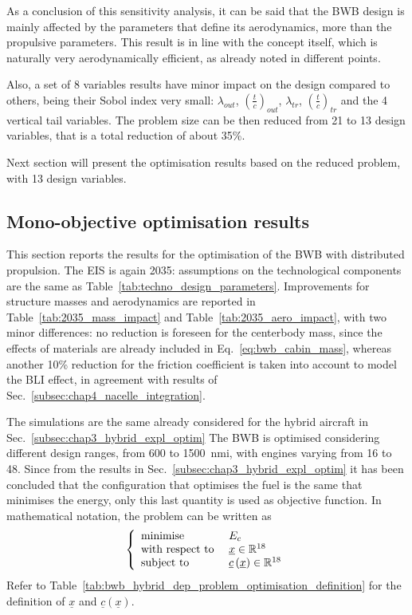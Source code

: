 As a conclusion of this sensitivity analysis, it can be said that the BWB design is mainly affected by the parameters that define its aerodynamics, more than the propulsive parameters. 
This result is in line with the concept itself, which is naturally very aerodynamically efficient, as already noted in different points. 

Also, a set of 8 variables results have minor impact on the design compared to others, being their Sobol index very small: $\lambda_{out}$, $\left(\frac{t}{c}\right)_{out}$, $\lambda_{tr}$, $\left(\frac{t}{c}\right)_{tr}$ and the 4 vertical tail variables. 
The problem size can be then reduced from 21 to 13 design variables, that is a total reduction of about 35\%.

Next section will present the optimisation results based on the reduced problem, with 13 design variables. 

\subsection{Mono-objective optimisation results}
\label{subsec:chap4_bwb_monoobj_res}

This section reports the results for the optimisation of the BWB with distributed propulsion. 
The EIS is again 2035: assumptions on the technological components are the same as Table~\ref{tab:techno_design_parameters}.
Improvements for structure masses and aerodynamics are reported in Table~\ref{tab:2035_mass_impact} and Table~\ref{tab:2035_aero_impact}, with two minor differences: no reduction is foreseen for the centerbody mass, since the effects of materials are already included in Eq.~\eqref{eq:bwb_cabin_mass}, whereas another 10\% reduction for the friction coefficient is taken into account to model the BLI effect, in agreement with results of Sec.~\ref{subsec:chap4_nacelle_integration}. 

The simulations are the same already considered for the hybrid aircraft in Sec.~\ref{subsec:chap3_hybrid_expl_optim}
The BWB is optimised considering different design ranges, from 600 to 1500~nmi, with engines varying from 16 to 48. 
Since from the results in Sec.~\ref{subsec:chap3_hybrid_expl_optim} it has been concluded that the configuration that optimises the fuel is the same that minimises the energy, only this last quantity is used as objective function. 
In mathematical notation, the problem can be written as
\begin{equation*}
\left\{\begin{array}{l l}
		\textrm{minimise } & E_c \\
		\textrm{with respect to } & \underline{x}\in\mathbb{R}^{18} \\
		\textrm{subject to } & \underline{c}\left(\underline{x}\right)\in\mathbb{R}^{18} \\						 
	\end{array}\right.
\end{equation*}
Refer to Table~\ref{tab:bwb_hybrid_dep_problem_optimisation_definition} for the definition of $\underline{x}$ and $\underline{c}\left(\underline{x}\right)$.

